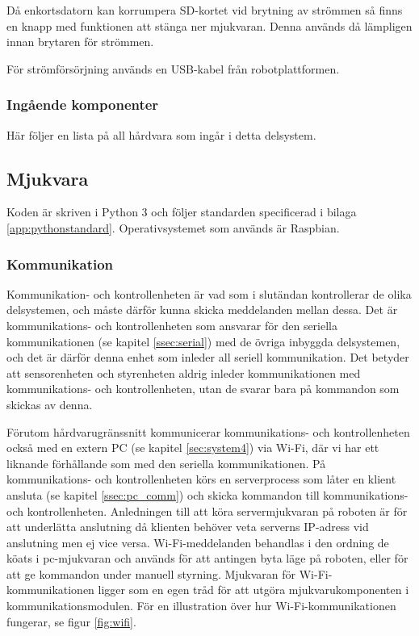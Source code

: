 \documentclass[a4paper,11pt]{article}
\begin{document}
Då enkortsdatorn kan korrumpera SD-kortet vid brytning av strömmen så finns en knapp med funktionen att stänga ner mjukvaran. Denna används då lämpligen innan brytaren för strömmen.

För strömförsörjning används en USB-kabel från robotplattformen.

\subsubsection{Ingående komponenter}
Här följer en lista på all hårdvara som ingår i detta delsystem.

\begin{HardwareList}
\end{HardwareList}

\subsection{Mjukvara}
Koden är skriven i Python 3 och följer standarden specificerad i bilaga \ref{app:pythonstandard}. Operativsystemet som används är Raspbian.

\subsubsection{Kommunikation}\label{ssec:brain_comm}
Kommunikation- och kontrollenheten är vad som i slutändan kontrollerar de olika delsystemen, och måste därför kunna skicka meddelanden mellan dessa. Det är kommunikations- och kontrollenheten som ansvarar för den seriella kommunikationen (se kapitel \ref{ssec:serial}) med de övriga inbyggda delsystemen, och det är därför denna enhet som inleder all seriell kommunikation. Det betyder att sensorenheten och styrenheten aldrig inleder kommunikationen med kommunikations- och kontrollenheten, utan de svarar bara på kommandon som skickas av denna.

Förutom hårdvarugränssnitt kommunicerar  kommunikations- och kontrollenheten också med en extern PC (se kapitel \ref{sec:system4}) via Wi-Fi, där vi har ett liknande förhållande som med den seriella kommunikationen. På kommunikations- och kontrollenheten körs en serverprocess som låter en klient ansluta (se kapitel \ref{ssec:pc_comm}) och skicka kommandon till kommunikations- och kontrollenheten. Anledningen till att köra servermjukvaran på roboten är för att underlätta anslutning då klienten behöver veta serverns IP-adress vid anslutning men ej vice versa. Wi-Fi-meddelanden behandlas i den ordning de köats i pc-mjukvaran och används för att antingen byta läge på roboten, eller för att ge kommandon under manuell styrning. Mjukvaran för Wi-Fi-kommunikationen ligger som en egen tråd för att utgöra mjukvarukomponenten i kommunikationsmodulen. För en illustration över hur Wi-Fi-kommunikationen fungerar, se figur \ref{fig:wifi}.
\end{document}
